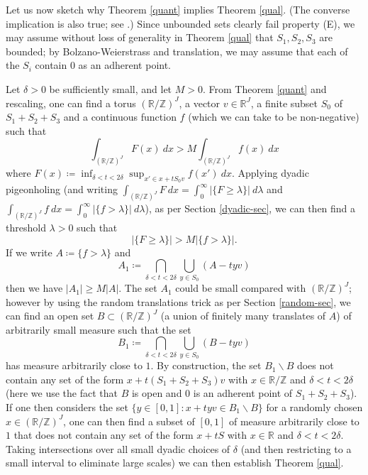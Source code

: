 \documentclass[12pt,a4paper,reqno]{amsart}
\numberwithin{equation}{section}
\theoremstyle{plain}
\theoremstyle{definition}
\newcommand\R{\mathbb{R}}
\newcommand\Z{\mathbb{Z}}
\begin{document}
Let us now sketch why Theorem \ref{quant} implies Theorem \ref{qual}.  (The converse implication is also true; see \cite[\S 2]{similarity}.)
Since unbounded sets clearly fail property (E), we may assume without loss of generality in Theorem \ref{qual} that $S_1,S_2,S_3$ are bounded; by Bolzano-Weierstrass and translation, we may assume that each of the $S_i$ contain $0$ as an adherent point.

Let $\delta>0$ be sufficiently small, and let $M>0$.  From Theorem \ref{quant} and rescaling, one can find a torus $(\R/\Z)^J$, a vector $v \in \R^J$, a finite subset $S_0$ of $S_1+S_2+S_3$ and a continuous function $f$ (which we can take to be non-negative) such that
$$ \int_{(\R/\Z)^J} F(x)\ dx > M \int_{(\R/\Z)^J} f(x)\ dx$$
where $F(x) \coloneqq  \inf_{\delta < t < 2\delta} \sup_{x' \in x+t S_0 v} f(x')\ dx$.  Applying dyadic pigeonholing (and writing $\int_{(\R/\Z)^J} F\ dx = \int_0^\infty |\{ F \geq \lambda \}|\ d\lambda$ and $\int_{(\R/\Z)^J} f\ dx = \int_0^\infty |\{ f > \lambda \}|\ d\lambda$), as per Section \ref{dyadic-sec}, we can then find a threshold $\lambda>0$ such that
$$ |\{ F \geq \lambda\}| > M |\{ f > \lambda\}|.$$
If we write $A \coloneqq  \{ f > \lambda\}$ and 
$$ A_1 \coloneqq \bigcap_{\delta < t < 2\delta} \bigcup_{y \in S_0} (A - tyv)$$
then we have $|A_1| \geq M |A|$.  The set $A_1$ could be small compared with $(\R/\Z)^J$; however by using the random translations trick as per Section \ref{random-sec}, we can find an open set $B \subset (\R/\Z)^J$ (a union of finitely many translates of $A$) of arbitrarily small measure such that the set
$$ B_1 \coloneqq \bigcap_{\delta < t < 2\delta} \bigcup_{y \in S_0} (B - tyv)$$
has measure arbitrarily close to $1$.  By construction, the set $B_1 \backslash B$ does not contain any set of the form $x+t(S_1+S_2+S_3)v$ with $x \in \R/\Z$ and $\delta < t < 2\delta$ (here we use the fact that $B$ is open and $0$ is an adherent point of $S_1+S_2+S_3$). If one then considers the set $\{ y \in [0,1]: x+tyv \in B_1 \backslash B\}$ for a randomly chosen $x \in (\R/\Z)^J$, one can then find a subset of $[0,1]$ of measure arbitrarily close to $1$ that does not contain any set of the form $x+tS$ with $x \in \R$ and $\delta < t < 2\delta$. Taking intersections over all small dyadic choices of $\delta$ (and then restricting to a small interval to eliminate large scales) we can then establish Theorem \ref{qual}.
\end{document}
